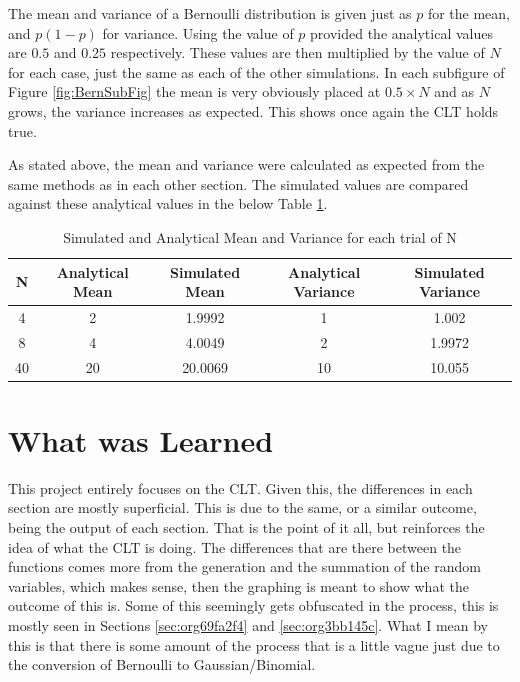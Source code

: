 \documentclass[a4paper, 11pt]{article}
\begin{document}
\medskip
\noindent
The mean and variance of a Bernoulli distribution is given just as \(p\) for the mean, and \(p(1-p)\) for variance. Using the value of \(p\) provided the analytical values are \(0.5\) and \(0.25\) respectively.
These values are then multiplied by the value of \(N\) for each case, just the same as each of the other simulations.
In each subfigure of Figure \ref{fig:BernSubFig} the mean is very obviously placed at \(0.5 \times N\) and as \(N\) grows, the variance increases as expected. This shows once again the CLT holds true.


\medskip
\noindent
As stated above, the mean and variance were calculated as expected from the same methods as in each other section. The simulated values are compared against these analytical values in the below Table \ref{tab:BernTable}.

\begin{table}[htbp]
\caption{\label{tab:BernTable}Simulated and Analytical Mean and Variance for each trial of N}
\centering
\begin{tabular}{|c|c|c|c|c|}
\hline
N & Analytical Mean & Simulated Mean & Analytical Variance & Simulated Variance\\
\hline
4 & 2 & 1.9992 & 1 & 1.002\\
8 & 4 & 4.0049 & 2 & 1.9972\\
40 & 20 & 20.0069 & 10 & 10.055\\
\hline
\end{tabular}
\end{table}


\section{What was Learned}
\label{sec:orgc2fcf96}
This project entirely focuses on the CLT. Given this, the differences in each section are mostly superficial. This is due to the same, or a similar outcome, being the output of each section. That is the point of it all, but reinforces the idea of what the CLT is doing. The differences that are there between the functions comes more from the generation and the summation of the random variables, which makes sense, then the graphing is meant to show what the outcome of this is. Some of this seemingly gets obfuscated in the process, this is mostly seen in Sections \ref{sec:org69fa2f4} and \ref{sec:org3bb145c}.
What I mean by this is that there is some amount of the process that is a little vague just due to the conversion of Bernoulli to Gaussian/Binomial.
\end{document}
